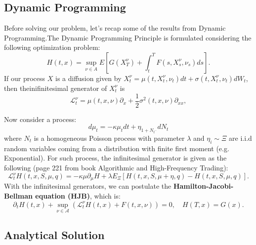 \subsection{Dynamic Programming}
Before solving our problem, let's recap some of the results from Dynamic Programming.The Dynamic Programming Principle is formulated considering the following optimization problem:
\begin{displaymath}
	H(t,x) = \sup_{\nu \in A} E \left[
	G(X^\nu_T) + \int^T_t F(s,X^\nu_s, \nu_s) ds
	\right].
\end{displaymath}
If our process $X$ is a diffusion given by $X_t^\nu = \mu(t,X^\nu_t, \nu_t) dt  + \sigma(t,X^\nu_t, \nu_t) dW_t$, then theinifinitesimal generator of $X^\nu_t$ is
\begin{displaymath}
	\mathcal L^\nu_t = \mu(t,x,\nu) \partial_x + \frac{1}{2}\sigma^2(t,x,\nu) \partial_{xx},
\end{displaymath}

Now consider a process:
\begin{displaymath}
	d\mu_t = -\kappa \mu_t dt + \eta_{1+N_{t^-}} dN_t
\end{displaymath}
where $N_t$ is a homogeneous Poisson process with parameter $\lambda$ and
$\eta_i \sim \Xi$ are i.i.d random variables
coming from a distribution with finite first moment (e.g. Exponential).
For such process, the
infinitesimal generator is given as the following (page 221 from book Algorithmic and High-Frequency Trading):
\begin{displaymath}
	\mathcal L^\nu_t H(t,x,S,\mu,q) = -\kappa \mu\partial_\mu H + \lambda E_\Xi[H(t,x, S, \mu+\eta,q) - H(t,x,S,\mu,q)].
\end{displaymath}
With the infinitesimal generators, we can postulate the \textbf{Hamilton-Jacobi-Bellman equation (HJB)}, which is:
\begin{displaymath}
	\partial_t H(t,x) +  \sup_{\nu \in \mathcal A}(\mathcal L^\nu_t H(t,x) + F(t,x,\nu)) = 0, \quad H(T,x) = G(x).
\end{displaymath}

\subsection{Analytical Solution}

